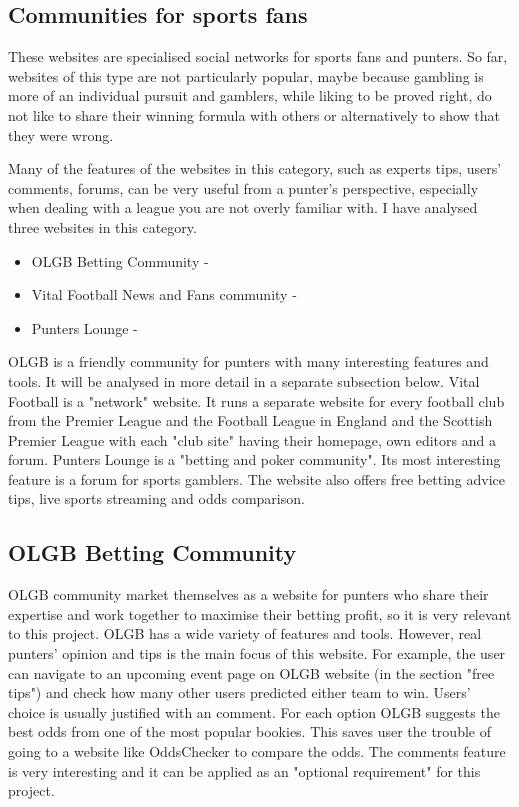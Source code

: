 \subsection{Communities for sports fans}
\label{subsec:communities_req}
These websites are specialised social networks for sports fans and punters. So far, websites of this type are not particularly popular, maybe because gambling is more of an individual pursuit and gamblers, while liking to be proved right, do not like to share their winning formula with others or alternatively to show that they were wrong.

Many of the features of the websites in this category, such as experts tips, users' comments, forums, can be very useful from a punter's perspective, especially when dealing with a league you are not overly familiar with. I have analysed three websites in this category.
	
\begin{itemize}
	\item OLGB Betting Community - \citep{source:olgb}
	\item Vital Football News and Fans community - \citep{source:vitalfootball}
	\item Punters Lounge - \citep{source:punterslounge}
\end{itemize}

OLGB is a friendly community for punters with many interesting features and tools. It will be analysed in more detail in a separate subsection below. Vital Football is a "network" website. It runs a separate website for every football club from the Premier League and the Football League in England and the Scottish Premier League with each "club site" having their homepage, own editors and a forum. Punters Lounge is a "betting and poker community". Its most interesting feature is a forum for sports gamblers. The website also offers free betting advice tips, live sports streaming and odds comparison.
	
\subsection{OLGB Betting Community}
\label{subsec:olgb_req}
OLGB community market themselves as a website for punters who share their expertise and work together to maximise their betting profit, so it is very relevant to this project. OLGB has a wide variety of features and tools. However, real punters' opinion and tips is the main focus of this website. For example, the user can navigate to an upcoming event page on OLGB website (in the section "free tips") and check how many other users predicted either team to win. Users' choice is usually justified with an comment. For each option OLGB suggests the best odds from one of the most popular bookies. This saves user the trouble of going to a website like OddsChecker\citep{web:oddschecker} to compare the odds. The comments feature is very interesting and it can be applied as an "optional requirement" for this project.

